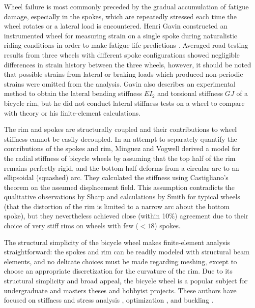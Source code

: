 \documentclass[../thesis.tex]{subfiles}
\begin{document}
Wheel failure is most commonly preceded by the gradual accumulation of fatigue damage, especially in the spokes, which are repeatedly stressed each time the wheel rotates or a lateral load is encountered. Henri Gavin constructed an instrumented wheel for measuring strain on a single spoke during naturalistic riding conditions in order to make fatigue life predictions \cite{Gavin}. Averaged road testing results from three wheels with different spoke configurations showed negligible differences in strain history between the three wheels, however, it should be noted that possible strains from lateral or braking loads which produced non-periodic strains were omitted from the analysis. Gavin also describes an experimental method to obtain the lateral bending stiffness $EI_2$ and torsional stiffness $GJ$ of a bicycle rim, but he did not conduct lateral stiffness tests on a wheel to compare with theory or his finite-element calculations.

The rim and spokes are structurally coupled and their contributions to wheel stiffness cannot be easily decoupled. In an attempt to separately quantify the contributions of the spokes and rim, Minguez and Vogwell \cite{MinguezVogwell} derived a model for the radial stiffness of bicycle wheels by assuming that the top half of the rim remains perfectly rigid, and the bottom half deforms from a circular arc to an ellipsoidal (squashed) arc. They calculated the stiffness using Castigliano's theorem on the assumed displacement field. This assumption contradicts the qualitative observations by Sharp and calculations by Smith for typical wheels (that the distortion of the rim is limited to a narrow arc about the bottom spoke), but they nevertheless achieved close (within 10\%) agreement due to their choice of very stiff rims on wheels with few ($<18$) spokes.

The structural simplicity of the bicycle wheel makes finite-element analysis straightforward: the spokes and rim can be readily modeled with structural beam elements, and no delicate choices must be made regarding meshing, except to choose an appropriate discretization for the curvature of the rim. Due to its structural simplicity and broad appeal, the bicycle wheel is a popular subject for undergraduate and masters theses and  hobbyist projects. These authors have focused on stiffness and stress analysis \cite{Ng,Hartz}, optimization \cite{Keller,Svensson}, and buckling \cite{Kern}.
\end{document}
